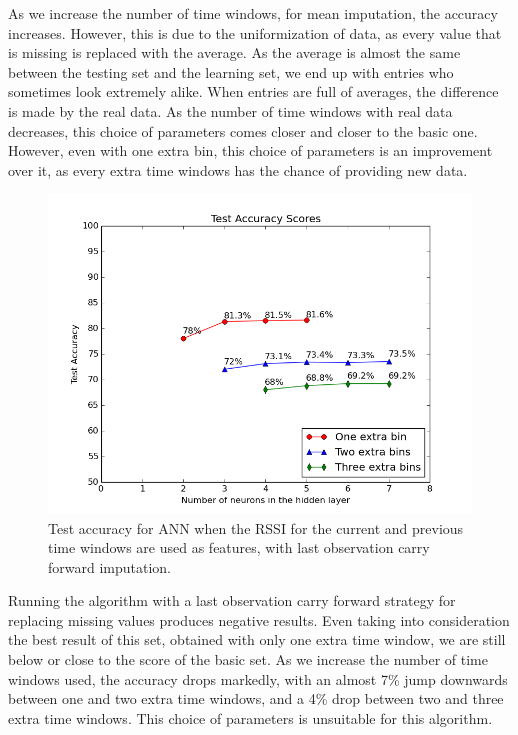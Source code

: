 As we increase the number of time windows, for mean imputation, the accuracy increases. However, this is due to the uniformization of data, as every value that is missing is replaced with the average. As the average is almost the same between the testing set and the learning set, we end up with entries who sometimes look extremely alike. When entries are full of averages, the difference is made by the real data. As the number of time windows with real data decreases, this choice of parameters comes closer and closer to the basic one. However, even with one extra bin, this choice of parameters is an improvement over it, as every extra time windows has the chance of providing new data.   

\begin{figure}[h]
	\begin{center}
		\includegraphics[scale=0.6]{figures/ann_params1.png}
	\end{center}
	
	\caption{Test accuracy for ANN when the RSSI for the current and previous time windows are used as features, with last observation carry forward imputation.}
	\label{pic:ann_params2}

\end{figure}

Running the algorithm with a last observation carry forward strategy for replacing missing values produces negative results. Even taking into consideration the best result of this set, obtained with only one extra time window, we are still below or close to the score of the basic set.  As we increase the number of time windows used, the accuracy drops markedly, with an almost 7\% jump downwards between one and two extra time windows, and a 4\% drop between two and three extra time windows. This choice of parameters is unsuitable for this algorithm.    

